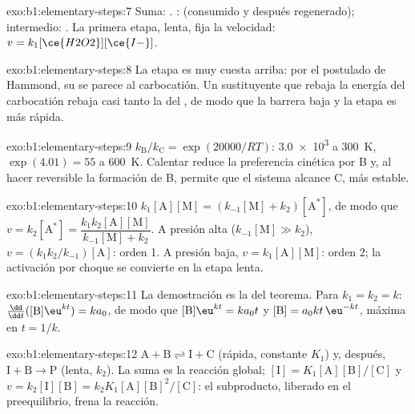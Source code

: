 \begin{solution}{exo:b1:elementary-steps:7}
Suma: . :  (consumido y después
regenerado); intermedio: . La primera etapa, lenta, fija la
velocidad: $v = k_1[\ce{H2O2}][\ce{I-}]$.
\end{solution}

\begin{solution}{exo:b1:elementary-steps:8}
La etapa es muy cuesta arriba: por el postulado de Hammond, su  se parece al carbocatión. Un sustituyente que rebaja la
energía del carbocatión rebaja casi tanto la del , de
modo que la barrera baja y la etapa es más rápida.
\end{solution}

\begin{solution}{exo:b1:elementary-steps:9}
$k_{\mathrm B}/k_{\mathrm C} = \exp(20000/RT)$: \num{3.0e3} a \qty{300}{K},
$\exp(4.01) = 55$ a \qty{600}{K}. Calentar reduce la preferencia cinética
por B y, al hacer reversible la formación de B, permite que el sistema
alcance C, más estable.
\end{solution}

\begin{solution}{exo:b1:elementary-steps:10}
$k_1[\mathrm{A}][\mathrm{M}] = (k_{-1}[\mathrm{M}] + k_2)[\mathrm{A}^*]$,
de modo que $v = k_2[\mathrm{A}^*] = \dfrac{k_1k_2[\mathrm{A}][\mathrm{M}]}{k_{-1}[\mathrm{M}]
+ k_2}$. A presión alta ($k_{-1}[\mathrm{M}] \gg k_2$), $v =
(k_1k_2/k_{-1})[\mathrm{A}]$: orden 1. A presión baja, $v =
k_1[\mathrm{A}][\mathrm{M}]$: orden 2; la activación por choque se
convierte en la etapa lenta.
\end{solution}

\begin{solution}{exo:b1:elementary-steps:11}
La demostración es la del teorema. Para $k_1 = k_2 = k$:
$\frac{\dd}{\dd t}([\mathrm{B}]\eu^{kt}) = ka_0$, de modo que $[\mathrm{B}]\eu^{kt} =
ka_0t$ y $[\mathrm{B}] = a_0kt\,\eu^{-kt}$, máxima en $t = 1/k$.
\end{solution}

\begin{solution}{exo:b1:elementary-steps:12}
$\mathrm{A} + \mathrm{B} \rightleftharpoons \mathrm{I} + \mathrm{C}$
(rápida, constante $K_1$) y, después, $\mathrm{I} + \mathrm{B} \to \mathrm{P}$
(lenta, $k_2$). La suma es la reacción global; $[\mathrm{I}] =
K_1[\mathrm{A}][\mathrm{B}]/[\mathrm{C}]$ y $v = k_2[\mathrm{I}][\mathrm{B}]
= k_2K_1[\mathrm{A}][\mathrm{B}]^2/[\mathrm{C}]$: el subproducto, liberado
en el preequilibrio, frena la reacción.
\end{solution}

